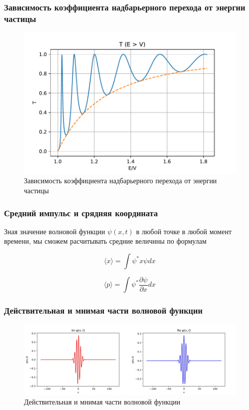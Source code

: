 \documentclass{beamer}
\begin{document}
\begin{frame}
\frametitle{Зависимость коэффициента надбарьерного перехода от энергии частицы}

\begin{figure}
    \centering
    \includegraphics[scale=0.5]{images/TransmissionPropability1.pdf}
    \caption{Зависимость коэффициента надбарьерного перехода от энергии частицы}
    \label{fig:TransmissionPropability1}
\end{figure}
    
\end{frame}

\begin{frame}
\frametitle{Средний импульс и срядняя координата}

Зная значение волновой функции $\psi(x, t)$ в любой точке в любой момент времени, мы сможем расчитывать средние величины
по формулам

\begin{equation*}
    \langle x \rangle = \int \psi^* x \psi dx
\end{equation*}

\begin{equation*}
    \langle p \rangle = \int \psi^* \frac{\partial \psi}{\partial x} dx
\end{equation*}
    
\end{frame}

\begin{frame}
\frametitle{Действительная и мнимая части волновой функции}

\begin{figure}
    \centering
    \includegraphics[scale=0.4]{images/PsiFunction.jpg}
    \caption{Действительная и мнимая части волновой функции}
    \label{fig:my_label}
\end{figure}
    
\end{frame}
\end{document}
